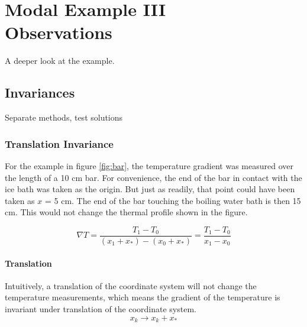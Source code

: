 \chapter[Modal Example III: Observations]{Modal Example III\\Observations}

A deeper look at the example.

\section{Invariances}  %
Separate methods, test solutions

\subsection{Translation Invariance}  %
For the example in figure \ref{fig:bar}, the temperature gradient was measured over the length of a 10 cm bar. For convenience, the end of the bar in contact with the ice bath was taken as the origin. But just as readily, that point could have been taken as $x$ = 5 cm. The end of the bar touching the boiling water bath is then 15 cm. This would not change the thermal profile shown in the figure.

  \begin{equation*}   %
    \nabla T = \frac{T_{1} - T_{0}} { (x_{1} + x_{*}) - (x_{0} + x_{*}) }
             = \frac{T_{1} - T_{0}} { x_{1} - x_{0} }
  \end{equation*}

\subsubsection{Translation}  %
Intuitively, a translation of the coordinate system will not change the temperature measurements, which means the gradient of the temperature is invariant under translation of the coordinate system.
  \begin{equation*}   %
    x_{k} \rightarrow x_{k} + x_{*}
  \end{equation*}

